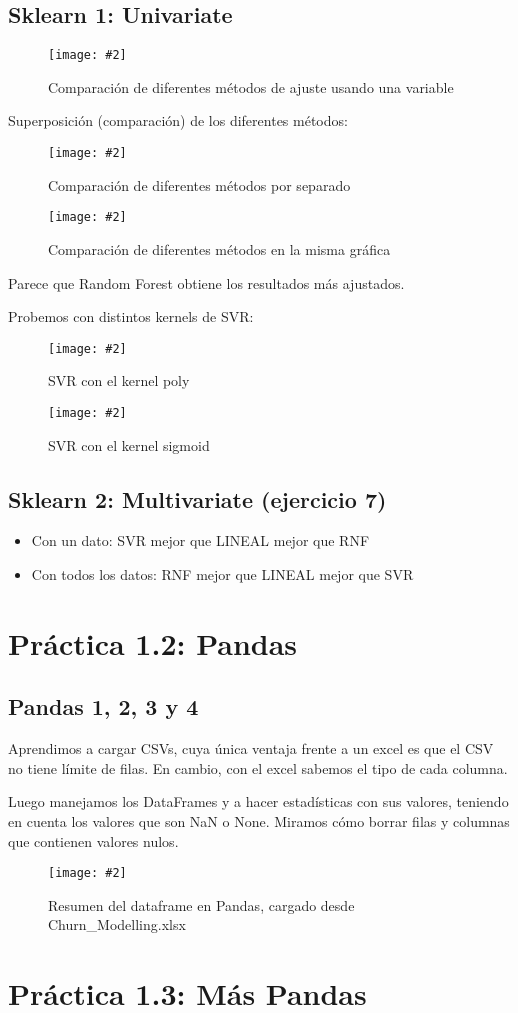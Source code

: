\documentclass[
12pt, 
spanish, 
singlespacing,
headsepline
]{article}
\newcommand{\image}[2]{
\begin{figure}[H]
	\caption{#1}
	\centering
	\texttt{[image: \#2]}
\end{figure}
}
\begin{document}
\subsection{Sklearn 1: Univariate}

\image{Comparación de diferentes métodos de ajuste usando una variable}{pl1/Figure_3.png}

Superposición (comparación) de los diferentes métodos:
\image{Comparación de diferentes métodos por separado}{pl1/Figure_4-1.png}

\image{Comparación de diferentes métodos en la misma gráfica}{pl1/Figure_4-2.png}

Parece que Random Forest obtiene los resultados más ajustados.

Probemos con distintos kernels de SVR:

\image{SVR con el kernel poly}{pl1/Figure_5-poly.png}
\image{SVR con el kernel sigmoid}{pl1/Figure_5-sigmoid.png}

\subsection{Sklearn 2: Multivariate (ejercicio 7)}
\begin{itemize}
\item Con un dato: SVR mejor que LINEAL mejor que RNF
\item Con todos los datos: RNF mejor que LINEAL mejor que SVR	
\end{itemize}

\section{Práctica 1.2: Pandas}
\subsection{Pandas 1, 2, 3 y 4}
Aprendimos a cargar CSVs, cuya única ventaja frente a un excel es que el CSV no tiene límite de filas. En cambio, con el excel sabemos el tipo de cada columna.

Luego manejamos los DataFrames y a hacer estadísticas con sus valores, teniendo en cuenta los valores que son NaN o None. Miramos cómo borrar filas y columnas que contienen valores nulos.

\image{Resumen del dataframe en Pandas, cargado desde Churn\string_Modelling.xlsx}{pl2/Figure_6.png}

\section{Práctica 1.3: Más Pandas}
\end{document}
